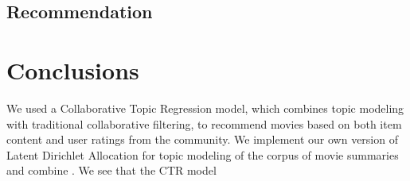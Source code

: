 \documentclass{article} %
\begin{document}
\subsection{Recommendation}



\section{Conclusions}
We used a Collaborative Topic Regression model, which combines topic modeling
with traditional collaborative filtering, to recommend movies based on both
item content and user ratings from the community. We implement our own version
of Latent Dirichlet Allocation for topic modeling of the corpus of movie
summaries and combine . We see that the CTR model  




\end{document}
